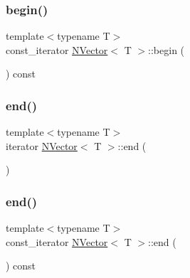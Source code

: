 \mbox{\label{class_n_vector_a39aa7aecfd17e2db8130f5fbc956bb8f}} 
\subsubsection{\texorpdfstring{begin()}{begin()}\hspace{0.1cm}{\footnotesize\ttfamily [2/2]}}
{\footnotesize\ttfamily template$<$typename T$>$ \\
const\+\_\+iterator \mbox{\hyperlink{class_n_vector}{N\+Vector}}$<$ T $>$\+::begin (\begin{DoxyParamCaption}{ }\end{DoxyParamCaption}) const\hspace{0.3cm}{\ttfamily [inline]}}

\mbox{\label{class_n_vector_a11675cb00213e89ae5a563f59d0f4ff3}} 
\subsubsection{\texorpdfstring{end()}{end()}\hspace{0.1cm}{\footnotesize\ttfamily [1/2]}}
{\footnotesize\ttfamily template$<$typename T$>$ \\
iterator \mbox{\hyperlink{class_n_vector}{N\+Vector}}$<$ T $>$\+::end (\begin{DoxyParamCaption}{ }\end{DoxyParamCaption})\hspace{0.3cm}{\ttfamily [inline]}}

\mbox{\label{class_n_vector_ac019e1018e5d0dd8113d2f2605aa2987}} 
\subsubsection{\texorpdfstring{end()}{end()}\hspace{0.1cm}{\footnotesize\ttfamily [2/2]}}
{\footnotesize\ttfamily template$<$typename T$>$ \\
const\+\_\+iterator \mbox{\hyperlink{class_n_vector}{N\+Vector}}$<$ T $>$\+::end (\begin{DoxyParamCaption}{ }\end{DoxyParamCaption}) const\hspace{0.3cm}{\ttfamily [inline]}}

